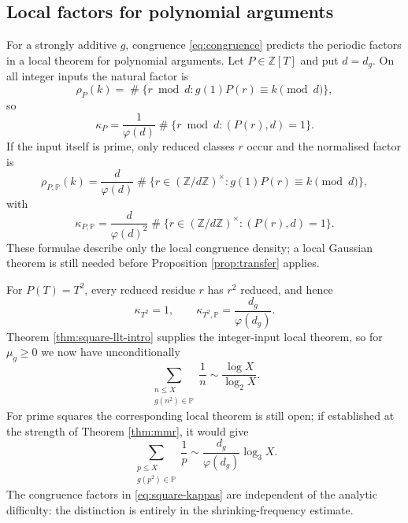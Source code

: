 \documentclass[11pt,reqno]{amsart}
\theoremstyle{plain}
\theoremstyle{definition}
\newcommand{\Z}{\mathbb{Z}}
\newcommand{\Pp}{\mathbb{P}}
\newcommand{\1}{\mathbf 1}
\DeclareMathOperator{\Card}{\#}
\begin{document}
\subsection{Local factors for polynomial arguments}

For a strongly additive $g$, congruence \eqref{eq:congruence} predicts the periodic factors in a local theorem for polynomial arguments.  Let $P\in\Z[T]$ and put $d=d_g$.  On all integer inputs the natural factor is
\begin{equation}\label{eq:rho-P}
 \rho_P(k)=\Card\{r\bmod d:g(1)P(r)\equiv k\pmod d\},
\end{equation}
so
\begin{equation}\label{eq:kappa-P}
 \kappa_P=\frac1{\varphi(d)}
 \Card\{r\bmod d:(P(r),d)=1\}.
\end{equation}
If the input itself is prime, only reduced classes $r$ occur and the normalised factor is
\begin{equation}\label{eq:rho-P-prime}
 \rho_{P,\Pp}(k)=\frac d{\varphi(d)}
 \Card\{r\in(\Z/d\Z)^\times:g(1)P(r)\equiv k\pmod d\},
\end{equation}
with
\begin{equation}\label{eq:kappa-P-prime}
 \kappa_{P,\Pp}=\frac d{\varphi(d)^2}
 \Card\{r\in(\Z/d\Z)^\times:(P(r),d)=1\}.
\end{equation}
These formulae describe only the local congruence density; a local Gaussian theorem is still needed before Proposition \ref{prop:transfer} applies.

For $P(T)=T^2$, every reduced residue $r$ has $r^2$ reduced, and hence
\begin{equation}\label{eq:square-kappas}
 \kappa_{T^2}=1,\qquad
 \kappa_{T^2,\Pp}=\frac{d_g}{\varphi(d_g)}.
\end{equation}
Theorem \ref{thm:square-llt-intro} supplies the integer-input local theorem, so for $\mu_g\ge0$ we now have unconditionally
\begin{equation}\label{eq:square-mertens-cond}
 \sum_{\substack{n\le X\\g(n^2)\in\Pp}}\frac1n
 \sim\frac{\log X}{\log_2X}.
\end{equation}
For prime squares the corresponding local theorem is still open; if established at the strength of Theorem \ref{thm:mmr}, it would give
\begin{equation}\label{eq:primesquare-mertens-cond}
 \sum_{\substack{p\le X\\g(p^2)\in\Pp}}\frac1p
 \sim\frac{d_g}{\varphi(d_g)}\log_3X.
\end{equation}
The congruence factors in \eqref{eq:square-kappas} are independent of the analytic difficulty: the distinction is entirely in the shrinking-frequency estimate.
\end{document}
